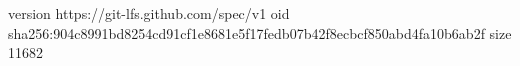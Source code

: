 version https://git-lfs.github.com/spec/v1
oid sha256:904c8991bd8254cd91cf1e8681e5f17fedb07b42f8ecbcf850abd4fa10b6ab2f
size 11682
